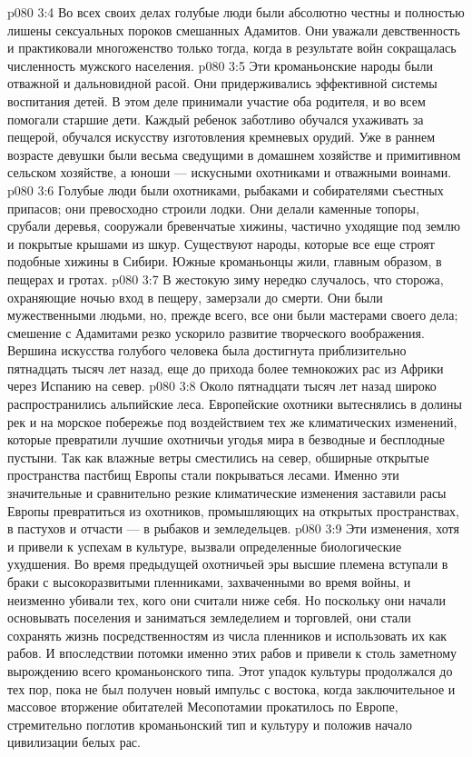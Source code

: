 \vs p080 3:4 Во всех своих делах голубые люди были абсолютно честны и полностью лишены сексуальных пороков смешанных Адамитов. Они уважали девственность и практиковали многоженство только тогда, когда в результате войн сокращалась численность мужского населения.
\vs p080 3:5 Эти кроманьонские народы были отважной и дальновидной расой. Они придерживались эффективной системы воспитания детей. В этом деле принимали участие оба родителя, и во всем помогали старшие дети. Каждый ребенок заботливо обучался ухаживать за пещерой, обучался искусству изготовления кремневых орудий. Уже в раннем возрасте девушки были весьма сведущими в домашнем хозяйстве и примитивном сельском хозяйстве, а юноши --- искусными охотниками и отважными воинами.
\vs p080 3:6 Голубые люди были охотниками, рыбаками и собирателями съестных припасов; они превосходно строили лодки. Они делали каменные топоры, срубали деревья, сооружали бревенчатые хижины, частично уходящие под землю и покрытые крышами из шкур. Существуют народы, которые все еще строят подобные хижины в Сибири. Южные кроманьонцы жили, главным образом, в пещерах и гротах.
\vs p080 3:7 В жестокую зиму нередко случалось, что сторожа, охраняющие ночью вход в пещеру, замерзали до смерти. Они были мужественными людьми, но, прежде всего, все они были мастерами своего дела; смешение с Адамитами резко ускорило развитие творческого воображения. Вершина искусства голубого человека была достигнута приблизительно пятнадцать тысяч лет назад, еще до прихода более темнокожих рас из Африки через Испанию на север.
\vs p080 3:8 \pc Около пятнадцати тысяч лет назад широко распространились альпийские леса. Европейские охотники вытеснялись в долины рек и на морское побережье под воздействием тех же климатических изменений, которые превратили лучшие охотничьи угодья мира в безводные и бесплодные пустыни. Так как влажные ветры сместились на север, обширные открытые пространства пастбищ Европы стали покрываться лесами. Именно эти значительные и сравнительно резкие климатические изменения заставили расы Европы превратиться из охотников, промышляющих на открытых пространствах, в пастухов и отчасти --- в рыбаков и земледельцев.
\vs p080 3:9 Эти изменения, хотя и привели к успехам в культуре, вызвали определенные биологические ухудшения. Во время предыдущей охотничьей эры высшие племена вступали в браки с высокоразвитыми пленниками, захваченными во время войны, и неизменно убивали тех, кого они считали ниже себя. Но поскольку они начали основывать поселения и заниматься земледелием и торговлей, они стали сохранять жизнь посредственностям из числа пленников и использовать их как рабов. И впоследствии потомки именно этих рабов и привели к столь заметному вырождению всего кроманьонского типа. Этот упадок культуры продолжался до тех пор, пока не был получен новый импульс с востока, когда заключительное и массовое вторжение обитателей Месопотамии прокатилось по Европе, стремительно поглотив кроманьонский тип и культуру и положив начало цивилизации белых рас.
